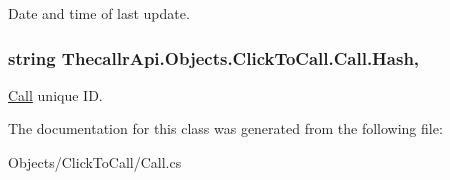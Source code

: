 Date and time of last update. 

\hypertarget{class_thecallr_api_1_1_objects_1_1_click_to_call_1_1_call_a3c29cf89b24f37e9c754a85a5df800aa}{
\subsubsection[{Hash}]{\setlength{\rightskip}{0pt plus 5cm}string Thecallr\+Api.\+Objects.\+Click\+To\+Call.\+Call.\+Hash\hspace{0.3cm}{\ttfamily [get]}, {\ttfamily [set]}}}\label{class_thecallr_api_1_1_objects_1_1_click_to_call_1_1_call_a3c29cf89b24f37e9c754a85a5df800aa}


\hyperlink{class_thecallr_api_1_1_objects_1_1_click_to_call_1_1_call}{Call} unique I\+D. 



The documentation for this class was generated from the following file\+:\begin{DoxyCompactItemize}
\item 
Objects/\+Click\+To\+Call/Call.\+cs\end{DoxyCompactItemize}
